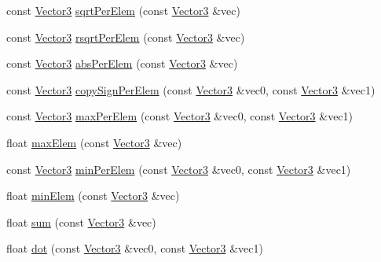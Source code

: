 \begin{DoxyCompactItemize}
const \hyperlink{classVectormath_1_1Aos_1_1Vector3}{Vector3} \hyperlink{namespaceVectormath_1_1Aos_ac024229a36a2ffe993553bed2aac7d8d}{sqrt\-Per\-Elem} (const \hyperlink{classVectormath_1_1Aos_1_1Vector3}{Vector3} \&vec)
\item 
const \hyperlink{classVectormath_1_1Aos_1_1Vector3}{Vector3} \hyperlink{namespaceVectormath_1_1Aos_afb76f1e1f4735675dfb2a2c6b6358fdc}{rsqrt\-Per\-Elem} (const \hyperlink{classVectormath_1_1Aos_1_1Vector3}{Vector3} \&vec)
\item 
const \hyperlink{classVectormath_1_1Aos_1_1Vector3}{Vector3} \hyperlink{namespaceVectormath_1_1Aos_ae287b8834043b94e6c2e1495f41f6870}{abs\-Per\-Elem} (const \hyperlink{classVectormath_1_1Aos_1_1Vector3}{Vector3} \&vec)
\item 
const \hyperlink{classVectormath_1_1Aos_1_1Vector3}{Vector3} \hyperlink{namespaceVectormath_1_1Aos_ab61909db311bae2e5554ffae03f9eee0}{copy\-Sign\-Per\-Elem} (const \hyperlink{classVectormath_1_1Aos_1_1Vector3}{Vector3} \&vec0, const \hyperlink{classVectormath_1_1Aos_1_1Vector3}{Vector3} \&vec1)
\item 
const \hyperlink{classVectormath_1_1Aos_1_1Vector3}{Vector3} \hyperlink{namespaceVectormath_1_1Aos_a6f11181eec6d571041cd945a3e474f61}{max\-Per\-Elem} (const \hyperlink{classVectormath_1_1Aos_1_1Vector3}{Vector3} \&vec0, const \hyperlink{classVectormath_1_1Aos_1_1Vector3}{Vector3} \&vec1)
\item 
float \hyperlink{namespaceVectormath_1_1Aos_aa7fdc62367b87dc05e68ec4f9690b573}{max\-Elem} (const \hyperlink{classVectormath_1_1Aos_1_1Vector3}{Vector3} \&vec)
\item 
const \hyperlink{classVectormath_1_1Aos_1_1Vector3}{Vector3} \hyperlink{namespaceVectormath_1_1Aos_aee74ccbca68e781206272cede656caa2}{min\-Per\-Elem} (const \hyperlink{classVectormath_1_1Aos_1_1Vector3}{Vector3} \&vec0, const \hyperlink{classVectormath_1_1Aos_1_1Vector3}{Vector3} \&vec1)
\item 
float \hyperlink{namespaceVectormath_1_1Aos_a51081c6fa153634f7924cb9dcebd63e5}{min\-Elem} (const \hyperlink{classVectormath_1_1Aos_1_1Vector3}{Vector3} \&vec)
\item 
float \hyperlink{namespaceVectormath_1_1Aos_a0e004b7e324f74a07c67542738a08108}{sum} (const \hyperlink{classVectormath_1_1Aos_1_1Vector3}{Vector3} \&vec)
\item 
float \hyperlink{namespaceVectormath_1_1Aos_a8d26432f4a6d296b0fbaaf0f260ee30b}{dot} (const \hyperlink{classVectormath_1_1Aos_1_1Vector3}{Vector3} \&vec0, const \hyperlink{classVectormath_1_1Aos_1_1Vector3}{Vector3} \&vec1)

\end{DoxyCompactItemize}
